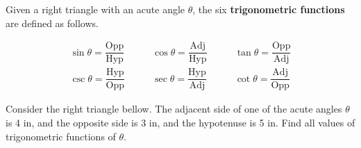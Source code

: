 \begin{definition}
  Given a right triangle with an acute angle $\theta$, the six \textbf{trigonometric functions} are defined as follows.

  \begin{minipage}{\textwidth}
    \begin{minipage}{0.55\textwidth}
        \[
        \begin{array}{ccc}
          \sin\theta = \dfrac{\text{Opp}}{\text{Hyp}}\quad & \quad 
          \cos\theta = \dfrac{\text{Adj}}{\text{Hyp}}\quad & \quad
          \tan\theta = \dfrac{\text{Opp}}{\text{Adj}} \\[1em]
          \csc\theta = \dfrac{\text{Hyp}}{\text{Opp}}\quad & \quad
          \sec\theta = \dfrac{\text{Hyp}}{\text{Adj}}\quad & \quad
          \cot\theta = \dfrac{\text{Adj}}{\text{Opp}}
        \end{array}  
        \]
    \end{minipage}
    \begin{minipage}{0.4\textwidth}
      \centering
  \end{minipage}
  \end{minipage}
\end{definition}

\begin{example}
  Consider the right triangle bellow. The adjacent
  side of one of the acute angles \(\theta\) is 4 in, and the opposite side is 3 in, and the hypotenuse is 5 in. Find all values of trigonometric functions of \(\theta\).\\
\end{example}


